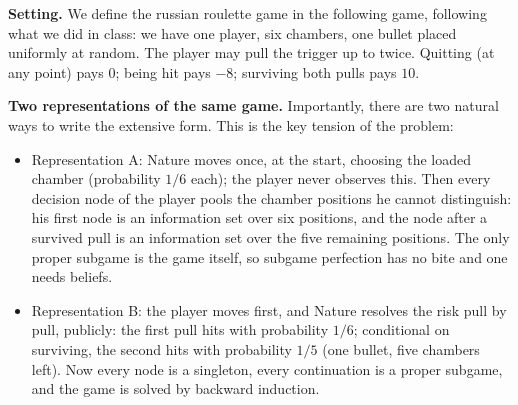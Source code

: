 \documentclass[12pt]{article}
\begin{document}
\textbf{Setting.}
We define the russian roulette game in the following game, following what we did in class: we have one player, six chambers, one bullet placed uniformly at
random. The player may pull the trigger up to twice. Quitting (at any point)
pays $0$; being hit pays $-8$; surviving both pulls pays $10$. 
 
\textbf{Two representations of the same game.}
Importantly, there are two natural ways to write the extensive form. This is the key tension of the problem:

\begin{itemize}
    \item Representation A: Nature moves once, at the start, choosing the loaded
chamber (probability $1/6$ each); the player never observes this. Then every
decision node of the player pools the chamber positions he cannot
distinguish: his first node is an information set over six positions, and the
node after a survived pull is an information set over the five remaining
positions. The only proper subgame is the game itself, so subgame perfection
has no bite and one needs beliefs.
    \item Representation B: the player moves first, and Nature resolves the risk pull
by pull, publicly: the first pull hits with probability $1/6$; conditional on
surviving, the second hits with probability $1/5$ (one bullet, five chambers
left). Now every node is a singleton, every continuation is a proper
subgame, and the game is solved by backward induction.
\end{itemize}
 
\end{document}
